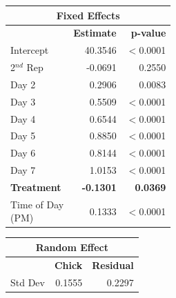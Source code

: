 \documentclass[a4paper, 10pt, titlepage]{article}
\newcommand\Tstrut{\rule{0pt}{2.9ex}}         %
\newcommand\Bstrut{\rule[-1.2ex]{0pt}{0pt}}   %
\begin{document}
\begin{table}[ht]
\centering
{} 
\begin{tabular}[t]{lrr}
 \hline
 \multicolumn{3}{c}{\textbf{Fixed Effects}}\\
 \hline
 & \textbf{Estimate} & \textbf{p-value}\Tstrut\\ 
 Intercept & 40.3546 & $<$0.0001\\
 2$^{nd}$ Rep & -0.0691 & 0.2550\\
 Day 2 & 0.2906 & 0.0083\\
 Day 3 & 0.5509 & $<$0.0001\\
 Day 4 & 0.6544 & $<$0.0001\\
 Day 5 & 0.8850 & $<$0.0001\\
 Day 6 & 0.8144 & $<$0.0001\\
 Day 7 & 1.0153 & $<$0.0001\\
 \textbf{Treatment} & \textbf{-0.1301} & \textbf{0.0369}\\
 \makecell[l]{Time of Day \\ (PM)\Bstrut} & 0.1333 & $<$0.0001\\
 \hline
\end{tabular}
\quad
\begin{tabular}[t]{lrr}
 \hline
\multicolumn{3}{c}{\textbf{Random Effect}}\\
 \hline
 & \textbf{Chick} & \textbf{Residual}\Tstrut \\ 
 Std Dev & 0.1555 & 0.2297\Bstrut\\
 \hline
\end{tabular}
\label{table:Est 95 R}
\end{table}
\end{document}
